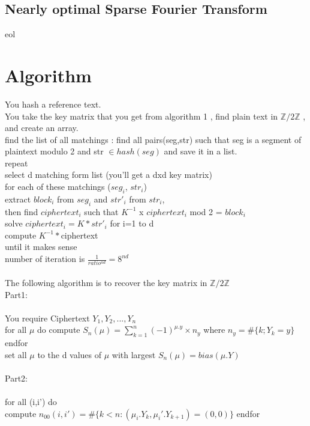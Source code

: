 \documentclass{article}
\begin{document}
\subsection{Nearly optimal Sparse Fourier Transform}
eol\\
\section{Algorithm}
You hash a reference text.\\
You take the key matrix that you get from algorithm 1 , find plain text in $\mathbb{Z}/2\mathbb{Z}$ , and create an array.\\
find the list of all matchings : find all pairs(seg,str) such that seg is a segment of plaintext modulo 2 and str $\in hash(seg)$ and save it in a list.\\
repeat\\
select d matching form list (you'll get a dxd key matrix)\\
for each of these matchings ($seg_{i}$, $str_{i}$)\\
extract $block_{i}$ from $seg_{i}$ and $str'_{i}$ from $str_{i}$,\\
then find $ciphertext_{i}$ such that $K^{-1}$ x $ciphertext_{i}$ mod 2 = $block_{i}$\\
solve $ciphertext_{i} = K * str'_{i}$ for i=1 to d\\
compute $K^{-1} * $ciphertext\\
until it makes sense\\
number of iteration is $ \frac{1}{ratio^{nd}} = 8^{nd}$
\\
\\
The following algorithm is to recover the key matrix in $\mathbb{Z}/2\mathbb{Z}$\\
Part1:\\
\\
You require Ciphertext $Y_1,Y_2,...,Y_n$\\
for all $\mu$ do
compute $S_n(\mu) = \sum_{k=1}^{n}{(-1)^{\mu.y} \times n_y}$ where $n_y=\#\{k;Y_k=y\}$\\
endfor\\
set all $\mu$ to the d values of $\mu$ with largest $S_n(\mu)=bias(\mu.Y)$\\
\\
Part2:\\
\\
for all (i,i') do\\
compute $n_{00}(i,i')=\#\{k<n:(\mu_i .Y_k,\mu_i'.Y_{k+1})=(0,0)\}$
endfor\\
\end{document}
